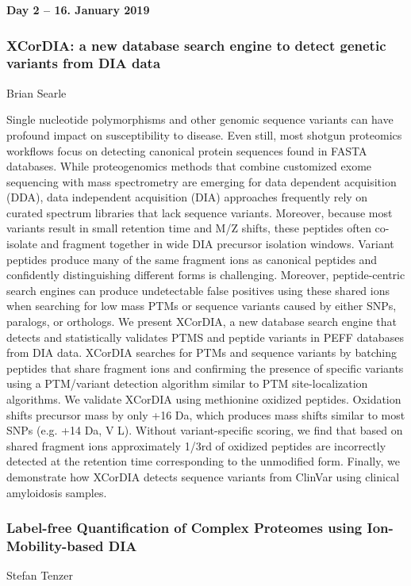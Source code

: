 
\noindent\textbf{Day 2 -- 16. January 2019}

\subsubsection*{\color{eubicRed} XCorDIA: a new database search engine to detect genetic variants from DIA data}
{\color{eubicGray}Brian Searle}

Single nucleotide polymorphisms and other genomic sequence variants can have
profound impact on susceptibility to disease. Even still, most shotgun
proteomics workflows focus on detecting canonical protein sequences found in
FASTA databases. While proteogenomics methods that combine customized exome
sequencing with mass spectrometry are emerging for data dependent acquisition
(DDA), data independent acquisition (DIA) approaches frequently rely on curated
spectrum libraries that lack sequence variants. Moreover, because most variants
result in small retention time and M/Z shifts, these peptides often co-isolate
and fragment together in wide DIA precursor isolation windows. Variant peptides
produce many of the same fragment ions as canonical peptides and confidently
distinguishing different forms is challenging. Moreover, peptide-centric search
engines can produce undetectable false positives using these shared ions when
searching for low mass PTMs or sequence variants caused by either SNPs,
paralogs, or orthologs. We present XCorDIA, a new database search engine that
detects and statistically validates PTMS and peptide variants in PEFF databases
from DIA data. XCorDIA searches for PTMs and sequence variants by batching
peptides that share fragment ions and confirming the presence of specific
variants using a PTM/variant detection algorithm similar to PTM
site-localization algorithms. We validate XCorDIA using methionine oxidized
peptides. Oxidation shifts precursor mass by only +16 Da, which produces mass
shifts similar to most SNPs (e.g. +14 Da, V  L). Without variant-specific
scoring, we find that based on shared fragment ions approximately 1/3rd of
oxidized peptides are incorrectly detected at the retention time corresponding
to the unmodified form. Finally, we demonstrate how XCorDIA detects sequence
variants from ClinVar using clinical amyloidosis samples.

\subsubsection*{\color{eubicRed} Label-free Quantification of Complex Proteomes using Ion-Mobility-based DIA }
{\color{eubicGray}Stefan Tenzer}

